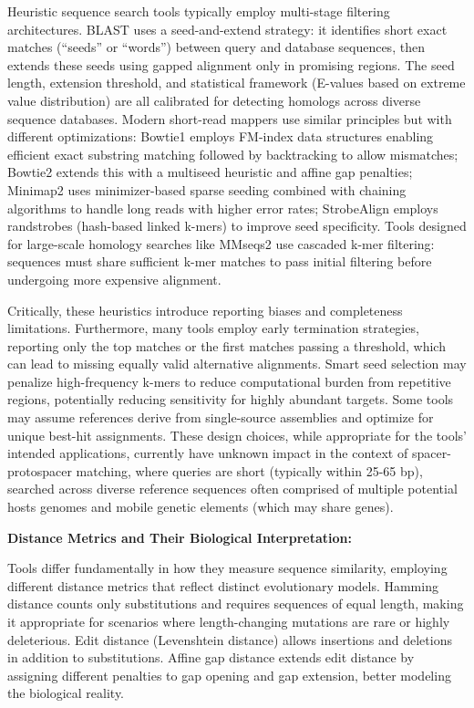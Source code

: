 \documentclass[
]{article}
\begin{document}
Heuristic sequence search tools typically employ multi-stage filtering
architectures. BLAST\autocite{Altschul1990_blast} uses a seed-and-extend
strategy: it identifies short exact matches (``seeds'' or ``words'')
between query and database sequences, then extends these seeds using
gapped alignment only in promising regions. The seed length, extension
threshold, and statistical framework (E-values based on extreme value
distribution) are all calibrated for detecting homologs across diverse
sequence databases. Modern short-read mappers use similar principles but
with different optimizations: Bowtie1 employs FM-index data structures
enabling efficient exact substring matching followed by backtracking to
allow mismatches\autocite{Langmead2009_bowtie}; Bowtie2 extends this
with a multiseed heuristic and affine gap
penalties\autocite{Langmead2012_bowtie2}; Minimap2 uses minimizer-based
sparse seeding combined with chaining algorithms to handle long reads
with higher error rates\autocite{Li2018_minimap2}; StrobeAlign employs
randstrobes (hash-based linked k-mers) to improve seed
specificity\autocite{Sahlin2022_strobealign}. Tools designed for
large-scale homology searches like MMseqs2 use cascaded k-mer filtering:
sequences must share sufficient k-mer matches to pass initial filtering
before undergoing more expensive
alignment\autocite{Steinegger2017_mmseqs2}.

Critically, these heuristics introduce reporting biases and completeness
limitations. Furthermore, many tools employ early termination
strategies, reporting only the top matches or the first matches passing
a threshold, which can lead to missing equally valid alternative
alignments. Smart seed selection may penalize high-frequency k-mers to
reduce computational burden from repetitive regions, potentially
reducing sensitivity for highly abundant targets. Some tools may assume
references derive from single-source assemblies and optimize for unique
best-hit assignments. These design choices, while appropriate for the
tools' intended applications, currently have unknown impact in the
context of spacer-protospacer matching, where queries are short
(typically within 25-65 bp), searched across diverse reference sequences
often comprised of multiple potential hosts genomes and mobile genetic
elements (which may share genes).

\textbf{Distance Metrics and Their Biological Interpretation:}

Tools differ fundamentally in how they measure sequence similarity,
employing different distance metrics that reflect distinct evolutionary
models. Hamming distance counts only substitutions and requires
sequences of equal length, making it appropriate for scenarios where
length-changing mutations are rare or highly deleterious. Edit distance
(Levenshtein distance) allows insertions and deletions in addition to
substitutions. Affine gap distance extends edit distance by assigning
different penalties to gap opening and gap extension, better modeling
the biological reality.
\end{document}
